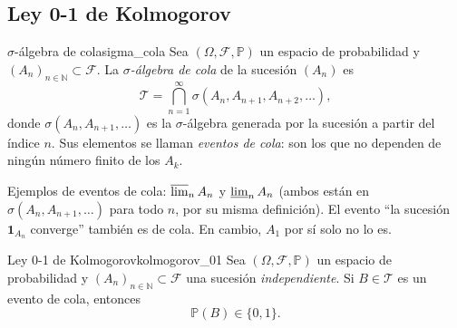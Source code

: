 \documentclass[11pt, a4paper]{article}
\begin{document}
\subsection{Ley 0-1 de Kolmogorov}

\begin{definicion}{$\sigma$-álgebra de cola}{sigma_cola}
Sea $(\Omega, \mathcal{F}, \mathbb{P})$ un espacio de probabilidad y $(A_n)_{n \in \mathbb{N}}
\subset \mathcal{F}$. La \emph{$\sigma$-álgebra de cola} de la sucesión $(A_n)$ es
$$ \mathcal{T} = \bigcap_{n=1}^\infty \sigma(A_n, A_{n+1}, A_{n+2}, \dots), $$
donde $\sigma(A_n, A_{n+1}, \dots)$ es la $\sigma$-álgebra generada por la sucesión a partir
del índice $n$. Sus elementos se llaman \emph{eventos de cola}: son los que no dependen de
ningún número finito de los $A_k$.
\end{definicion}

\obs Ejemplos de eventos de cola: $\varlimsup_n A_n$ y $\varliminf_n A_n$ (ambos están en
$\sigma(A_n, A_{n+1}, \dots)$ para todo $n$, por su misma definición). El evento ``la sucesión
$\mathbf{1}_{A_n}$ converge'' también es de cola. En cambio, $A_1$ por sí solo no lo es.

\begin{teorema}{Ley 0-1 de Kolmogorov}{kolmogorov_01}
Sea $(\Omega, \mathcal{F}, \mathbb{P})$ un espacio de probabilidad y $(A_n)_{n \in \mathbb{N}}
\subset \mathcal{F}$ una sucesión \emph{independiente}. Si $B \in \mathcal{T}$ es un evento de
cola, entonces
$$ \mathbb{P}(B) \in \{0, 1\}. $$
\end{teorema}
\end{document}
